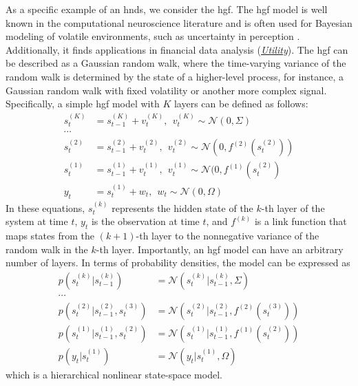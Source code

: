 As a specific example of an \ac{hnds}, we consider the \acf{hgf}.
The \ac{hgf} model is well known in the computational neuroscience literature and is often used for
Bayesian modeling of volatile environments, such as uncertainty in perception
\citep{mathys_uncertainty_2014, iglesias_hierarchical_2013, paulus_roadmap_2016}.
Additionally, it finds applications in financial data analysis \citep{senoz_switching_2021}  (\hyperlink{experiments:utility}{\emph{Utility}}).
The \ac{hgf} can be described as a Gaussian random walk, where the time-varying variance of the
random walk is determined by the state of a higher-level process, for instance, a Gaussian
random walk with fixed volatility or another more complex signal.
Specifically, a simple \ac{hgf} model with $K$ layers can be defined as follows:
\begin{equation}
  \label{eq:sim:hgf}
  \begin{aligned}
    s^{(K)}_t & = s^{(K)}_{t - 1} +
    v^{(K)}_t,~~v^{(K)}_t \sim \mathcal{N}(0, \Sigma)                               \\ \cdots & \\ s^{(2)}_t & =
    s^{(2)}_{t - 1} + v^{(2)}_t,~~v^{(2)}_t \sim \mathcal{N}(0, f^{(2)}(s^{(2)}_t)) \\
    s^{(1)}_t & = s^{(1)}_{t - 1} + v^{(1)}_t,~~v^{(1)}_t \sim \mathcal{N}(0,
    f^{(1)}(s^{(2)}_t)                                                                        \\ y_t & = s^{(1)}_t + w_t,~~w_t \sim \mathcal{N}(0, \Omega)
  \end{aligned}
\end{equation} 
In these equations, $s^{(k)}_t$ represents the hidden state of the $k$-th layer of the
system at time $t$, $y_t$ is the observation at time $t$, and $f^{(k)}$ is a link function
that maps states from the $(k + 1)$-th layer to the nonnegative variance of the random walk in
the $k$-th layer.
Importantly, an \ac{hgf} model can have an arbitrary number of layers.
In terms of probability densities, the model can be expressed as 
\begin{equation}
  \label{eq:sim:hgf_probabilities}
  \begin{aligned}
    p(s^{(k)}_t \vert s^{(k)}_{t - 1}) & =
    \mathcal{N}(s^{(k)}_t \vert s^{(k)}_{t - 1}, \Sigma)                                  \\ \cdots & \\ p(s^{(2)}_t \vert
    s^{(2)}_{t - 1}, s^{(3)}_t)        & = \mathcal{N}(s^{(2)}_{t} \vert s^{(2)}_{t - 1},
    f^{(2)}(s^{(3)}_t))                                                                   \\ p(s^{(1)}_t \vert s^{(1)}_{t - 1}, s^{(2)}_t) & =
    \mathcal{N}(s^{(1)}_{t} \vert s^{(1)}_{t - 1}, f^{(1)}(s^{(2)}_t))                    \\ p(y_t \vert s^{(1)}_t) &
       = \mathcal{N}(y_t \vert s^{(1)}_t, \Omega)
  \end{aligned}
\end{equation} which is a hierarchical nonlinear state-space model.
